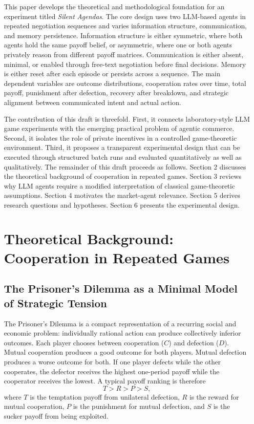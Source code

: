 \documentclass[12pt,a4paper]{article}
\begin{document}
This paper develops the theoretical and methodological foundation for an experiment titled \emph{Silent Agendas}. The core design uses two LLM-based agents in repeated negotiation sequences and varies information structure, communication, and memory persistence. Information structure is either symmetric, where both agents hold the same payoff belief, or asymmetric, where one or both agents privately reason from different payoff matrices. Communication is either absent, minimal, or enabled through free-text negotiation before final decisions. Memory is either reset after each episode or persists across a sequence. The main dependent variables are outcome distributions, cooperation rates over time, total payoff, punishment after defection, recovery after breakdown, and strategic alignment between communicated intent and actual action.

The contribution of this draft is threefold. First, it connects laboratory-style LLM game experiments with the emerging practical problem of agentic commerce. Second, it isolates the role of private incentives in a controlled game-theoretic environment. Third, it proposes a transparent experimental design that can be executed through structured batch runs and evaluated quantitatively as well as qualitatively. The remainder of this draft proceeds as follows. Section 2 discusses the theoretical background of cooperation in repeated games. Section 3 reviews why LLM agents require a modified interpretation of classical game-theoretic assumptions. Section 4 motivates the market-agent relevance. Section 5 derives research questions and hypotheses. Section 6 presents the experimental design.

\section{Theoretical Background: Cooperation in Repeated Games}

\subsection{The Prisoner's Dilemma as a Minimal Model of Strategic Tension}

The Prisoner's Dilemma is a compact representation of a recurring social and economic problem: individually rational action can produce collectively inferior outcomes. Each player chooses between cooperation ($C$) and defection ($D$). Mutual cooperation produces a good outcome for both players. Mutual defection produces a worse outcome for both. If one player defects while the other cooperates, the defector receives the highest one-period payoff while the cooperator receives the lowest. A typical payoff ranking is therefore
\[
T > R > P > S,
\]
where $T$ is the temptation payoff from unilateral defection, $R$ is the reward for mutual cooperation, $P$ is the punishment for mutual defection, and $S$ is the sucker payoff from being exploited.
\end{document}
